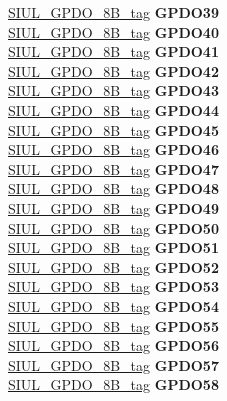 \begin{DoxyCompactItemize}
\begin{tabbing}
\>\>\mbox{\hyperlink{unionSIUL__GPDO__8B__tag}{SIUL\_GPDO\_8B\_tag}} {\bfseries GPDO39}\\
\>\>\mbox{\hyperlink{unionSIUL__GPDO__8B__tag}{SIUL\_GPDO\_8B\_tag}} {\bfseries GPDO40}\\
\>\>\mbox{\hyperlink{unionSIUL__GPDO__8B__tag}{SIUL\_GPDO\_8B\_tag}} {\bfseries GPDO41}\\
\>\>\mbox{\hyperlink{unionSIUL__GPDO__8B__tag}{SIUL\_GPDO\_8B\_tag}} {\bfseries GPDO42}\\
\>\>\mbox{\hyperlink{unionSIUL__GPDO__8B__tag}{SIUL\_GPDO\_8B\_tag}} {\bfseries GPDO43}\\
\>\>\mbox{\hyperlink{unionSIUL__GPDO__8B__tag}{SIUL\_GPDO\_8B\_tag}} {\bfseries GPDO44}\\
\>\>\mbox{\hyperlink{unionSIUL__GPDO__8B__tag}{SIUL\_GPDO\_8B\_tag}} {\bfseries GPDO45}\\
\>\>\mbox{\hyperlink{unionSIUL__GPDO__8B__tag}{SIUL\_GPDO\_8B\_tag}} {\bfseries GPDO46}\\
\>\>\mbox{\hyperlink{unionSIUL__GPDO__8B__tag}{SIUL\_GPDO\_8B\_tag}} {\bfseries GPDO47}\\
\>\>\mbox{\hyperlink{unionSIUL__GPDO__8B__tag}{SIUL\_GPDO\_8B\_tag}} {\bfseries GPDO48}\\
\>\>\mbox{\hyperlink{unionSIUL__GPDO__8B__tag}{SIUL\_GPDO\_8B\_tag}} {\bfseries GPDO49}\\
\>\>\mbox{\hyperlink{unionSIUL__GPDO__8B__tag}{SIUL\_GPDO\_8B\_tag}} {\bfseries GPDO50}\\
\>\>\mbox{\hyperlink{unionSIUL__GPDO__8B__tag}{SIUL\_GPDO\_8B\_tag}} {\bfseries GPDO51}\\
\>\>\mbox{\hyperlink{unionSIUL__GPDO__8B__tag}{SIUL\_GPDO\_8B\_tag}} {\bfseries GPDO52}\\
\>\>\mbox{\hyperlink{unionSIUL__GPDO__8B__tag}{SIUL\_GPDO\_8B\_tag}} {\bfseries GPDO53}\\
\>\>\mbox{\hyperlink{unionSIUL__GPDO__8B__tag}{SIUL\_GPDO\_8B\_tag}} {\bfseries GPDO54}\\
\>\>\mbox{\hyperlink{unionSIUL__GPDO__8B__tag}{SIUL\_GPDO\_8B\_tag}} {\bfseries GPDO55}\\
\>\>\mbox{\hyperlink{unionSIUL__GPDO__8B__tag}{SIUL\_GPDO\_8B\_tag}} {\bfseries GPDO56}\\
\>\>\mbox{\hyperlink{unionSIUL__GPDO__8B__tag}{SIUL\_GPDO\_8B\_tag}} {\bfseries GPDO57}\\
\>\>\mbox{\hyperlink{unionSIUL__GPDO__8B__tag}{SIUL\_GPDO\_8B\_tag}} {\bfseries GPDO58}\\

\end{tabbing}
\end{DoxyCompactItemize}
